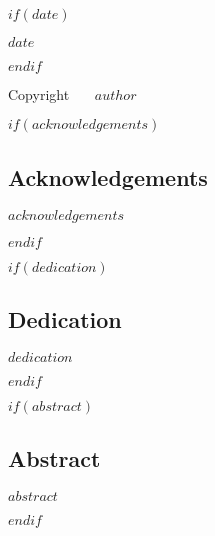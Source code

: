 \documentclass[$if(fontsize)$$fontsize$,$endif$$if(lang)$$babel-lang$,$endif$$if(papersize)$$papersize$paper,$endif$$for(classoption)$$classoption$$sep$,$endfor$]{$documentclass$}
\let\oldsection\section
\renewcommand\section{\clearpage\oldsection}
\begin{document}
~

~

~

$if(date)$
  \begin{center}
  $date$
  \end{center}
$endif$



\newpage


\thispagestyle{empty}

\clearpage
Copyright \ \textcopyright \ \the\year  \ $author$





\setcounter{page}{0}


\begin{doublespacing}

$if(acknowledgements)$
  \begin{center}
  \section{Acknowledgements}
  \end{center}
  
  \noindent
  $acknowledgements$

$endif$



$if(dedication)$
  \begin{center}
  \section{Dedication}
  \end{center}
  
  \noindent
  $dedication$
  
$endif$

$if(abstract)$
  \begin{center}
  \section{Abstract}
  \end{center}
  
  \noindent
  $abstract$

$endif$

\end{doublespacing}
\end{document}
